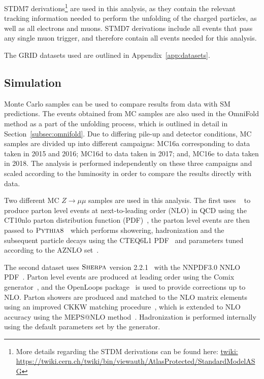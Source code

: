 STDM7 derivations\footnote{More details regarding the STDM derivations can be found here: \url{twiki: https://twiki.cern.ch/twiki/bin/viewauth/AtlasProtected/StandardModelASG}} are used in this analysis, as they contain the relevant tracking information needed to perform the
unfolding of the charged particles, as well as all electrons and muons. STMD7 derivations include all events that pass any single muon trigger, and therefore contain all events needed for this analysis.

The GRID datasets used are outlined in Appendix~\ref{app:datasets}.

\subsection{Simulation}
\label{sec:mc}
Monte Carlo samples can be used to compare results from data with SM predictions. The events obtained from MC samples are also used in the OmniFold method as a part of the unfolding process, which is outlined in detail in Section~\ref{subsec:omnifold}.
Due to differing pile-up and detector conditions, MC samples are divided up into different campaigns: MC16a corresponding to data taken in 2015 and 2016; MC16d to data taken in 2017; and, MC16e to data taken in 2018. The analysis is performed independently
on these three campaigns and scaled according to the luminosity in order to compare the results directly with data.

Two different MC $Z\rightarrow\mu\mu$ samples are used in this analysis. The first uses \powbox{}~\cite{Nason:2004rx,Frixione:2007vw,Alioli:2010xd} to produce parton level events at next-to-leading order (NLO) in QCD using the CT10nlo parton distribution function (PDF)~\cite{Lai:2010vv}, the parton level events are
then passed to $\textsc{Pythia8}$~\cite{Sjostrand:2007gs} which performs showering, hadronization and the subsequent particle decays using the CTEQ6L1 PDF~\cite{Lai:2010vv} and parameters tuned according to the AZNLO set~\cite{Aad:2014xaa}.

The second dataset uses $\textsc{Sherpa}$ version 2.2.1~\cite{Gleisberg:2008ta,Bothmann:2019yzt} with the NNPDF3.0 NNLO PDF~\cite{Ball:2012cx}. Parton level events are produced at leading order using the Comix generator~\cite{Gleisberg:2008fv}, and the OpenLoops package~\cite{Cascioli:2011va} is used to provide corrections up to NLO.
Parton showers are produced and matched to the NLO matrix elements using an improved CKKW matching procedure~\cite{Catani:2001cc,Hoeche:2009rj}, which is extended to NLO accuracy using the MEPS@NLO method~\cite{Hoeche:2012yf}. Hadronization is performed internally using the default parameters set by the generator.

